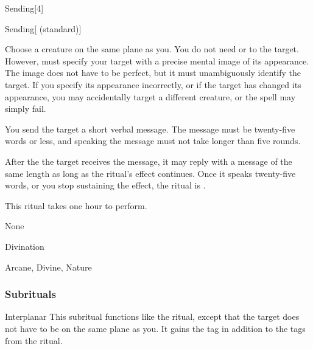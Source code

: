 \begin{spellsection}{Sending}[4]


\begin{ability}{Sending}[ (standard)]

Choose a creature on the same plane as you.
You do not need  or  to the target.
However,  must specify your target with a precise mental image of its appearance.
The image does not have to be perfect, but it must unambiguously identify the target.
If you specify its appearance incorrectly, or if the target has changed its appearance, you may accidentally target a different creature, or the spell may simply fail.

You send the target a short verbal message.
The message must be twenty-five words or less, and speaking the message must not take longer than five rounds.

After the the target receives the message, it may reply with a message of the same length as long as the ritual's effect continues.
Once it speaks twenty-five words, or you stop sustaining the effect, the ritual is .

This ritual takes one hour to perform.

\end{ability}


 None

 Divination

 Arcane, Divine, Nature
\end{spellsection}


\subsubsection{Subrituals}


\begin{ability}[\nth{6}]{Interplanar}
This subritual functions like the  ritual, except that the target does not have to be on the same plane as you.
It gains the  tag in addition to the tags from the  ritual.
\end{ability}
\vspace{0.25em}


